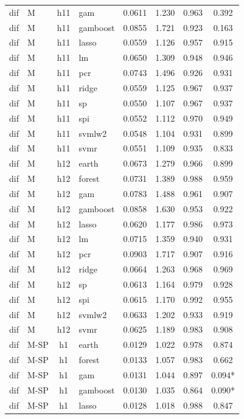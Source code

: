 \begin{ThreePartTable}
\begin{longtable}[t]{llclcccc}
dif & M & h11 & gam & 0.0611 & 1.230 & 0.963 & 0.392\\
dif & M & h11 & gamboost & 0.0855 & 1.721 & 0.923 & 0.163\\
dif & M & h11 & lasso & 0.0559 & 1.126 & 0.957 & 0.915\\
dif & M & h11 & lm & 0.0650 & 1.309 & 0.948 & 0.946\\
dif & M & h11 & pcr & 0.0743 & 1.496 & 0.926 & 0.931\\
dif & M & h11 & ridge & 0.0559 & 1.125 & 0.967 & 0.937\\
dif & M & h11 & sp & 0.0550 & 1.107 & 0.967 & 0.937\\
dif & M & h11 & spi & 0.0552 & 1.112 & 0.970 & 0.949\\
dif & M & h11 & svmlw2 & 0.0548 & 1.104 & 0.931 & 0.899\\
dif & M & h11 & svmr & 0.0551 & 1.109 & 0.935 & 0.833\\
\addlinespace
dif & M & h12 & earth & 0.0673 & 1.279 & 0.966 & 0.899\\
dif & M & h12 & forest & 0.0731 & 1.389 & 0.988 & 0.959\\
dif & M & h12 & gam & 0.0783 & 1.488 & 0.961 & 0.907\\
dif & M & h12 & gamboost & 0.0858 & 1.630 & 0.953 & 0.922\\
dif & M & h12 & lasso & 0.0620 & 1.177 & 0.986 & 0.973\\
dif & M & h12 & lm & 0.0715 & 1.359 & 0.940 & 0.931\\
dif & M & h12 & pcr & 0.0903 & 1.717 & 0.907 & 0.916\\
dif & M & h12 & ridge & 0.0664 & 1.263 & 0.968 & 0.969\\
dif & M & h12 & sp & 0.0613 & 1.164 & 0.979 & 0.928\\
dif & M & h12 & spi & 0.0615 & 1.170 & 0.992 & 0.955\\
dif & M & h12 & svmlw2 & 0.0633 & 1.202 & 0.933 & 0.919\\
dif & M & h12 & svmr & 0.0625 & 1.189 & 0.983 & 0.908\\
\addlinespace
dif & M-SP & h1 & earth & 0.0129 & 1.022 & 0.978 & 0.874\\
dif & M-SP & h1 & forest & 0.0133 & 1.057 & 0.983 & 0.662\\
dif & M-SP & h1 & gam & 0.0131 & 1.044 & 0.897 & 0.094*\\
dif & M-SP & h1 & gamboost & 0.0130 & 1.035 & 0.864 & 0.090*\\
dif & M-SP & h1 & lasso & 0.0128 & 1.018 & 0.988 & 0.847\\

\end{longtable}
\end{ThreePartTable}
